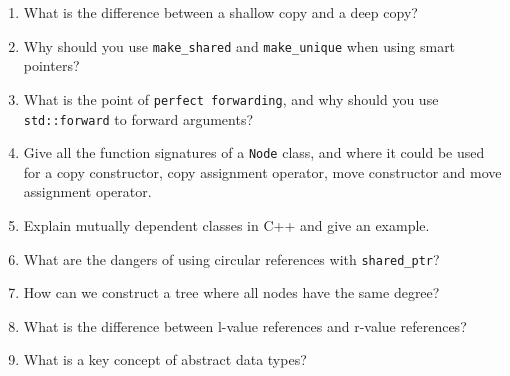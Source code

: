 \documentclass[11pt, letterpaper]{article}
\begin{document}
\begin{enumerate}[leftmargin=*, label=\textbf{\arabic*.}]
  \item What is the difference between a shallow copy and a deep copy?
    \begin{answerspace}
    \end{answerspace}

  \item Why should you use \texttt{make\_shared} and \texttt{make\_unique} when using smart pointers?
    \begin{answerspace}
    \end{answerspace}

  \item What is the point of \texttt{perfect forwarding}, and why should you use \texttt{std::forward} to forward arguments?
    \begin{answerspace}
    \end{answerspace}

  \item Give all the function signatures of a \texttt{Node} class, and where it could be used for a copy constructor, copy assignment operator, move constructor and move assignment operator.
    \begin{answerspace}
    \end{answerspace}

  \item Explain mutually dependent classes in C++ and give an example.
    \begin{answerspace}
    \end{answerspace}

  \item What are the dangers of using circular references with \texttt{shared\_ptr}?
    \begin{answerspace}
    \end{answerspace}
\clearpage
  \item How can we construct a tree where all nodes have the same degree?
    \begin{answerspace}
    \end{answerspace}

  \item What is the difference between l-value references and r-value references?
    \begin{answerspace}
    \end{answerspace}

  \item What is a key concept of abstract data types?
    \begin{answerspace}
    \end{answerspace}


\end{enumerate}
\end{document}
